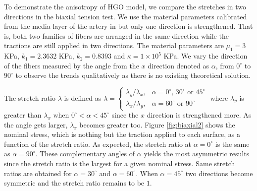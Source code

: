 To demonstrate the anisotropy of HGO model, we compare the stretches in two directions in the biaxial tension test. We use the material parameters calibrated from the media layer of the artery in \cite{Holzapfel2} but only one direction is strengthened. That is, both two families of fibers are arranged in the same direction while the tractions are still applied in two directions. The material parameters are $\mu_1 = 3$ KPa, $k_1 = 2.3632$ KPa, $k_2 = 0.8393$ and $\kappa = 1 \times 10^5$ KPa. We vary the direction of the fibers measured by the angle from the $x$ direction denoted as $\alpha$, from $0^\circ$ to $90^\circ$ to observe the trends qualitatively as there is no existing theoretical solution. 

The stretch ratio $\lambda$ is defined as $\lambda = 
\begin{cases}
	\lambda_y/\lambda_x, & \text{$\alpha = 0^\circ$, $30^\circ$ or $45^\circ$} \\
	\lambda_x/\lambda_y, & \text{$\alpha = 60^\circ$ or $90^\circ$}
\end{cases}
$
where $\lambda_y$ is greater than $\lambda_x$ when $0^\circ < \alpha < 45^\circ$ since the $x$ direction is strengthened more. As the angle gets larger, $\lambda_x$ becomes greater too. Figure \ref{fig:biaxial2} shows the nominal stress, which is nothing but the traction applied to each surface, as a function of the stretch ratio. As expected, the stretch ratio at $\alpha = 0^\circ$ is the same as $\alpha = 90^\circ$. These complementary angles of $\alpha$ yields the most asymmetric results since the stretch ratio is the largest for a given nominal stress. Same stretch ratios are obtained for $\alpha = 30^\circ$ and $\alpha = 60^\circ$. 
When $\alpha = 45^\circ$ two directions become symmetric and the stretch ratio remains to be $1$.
 

